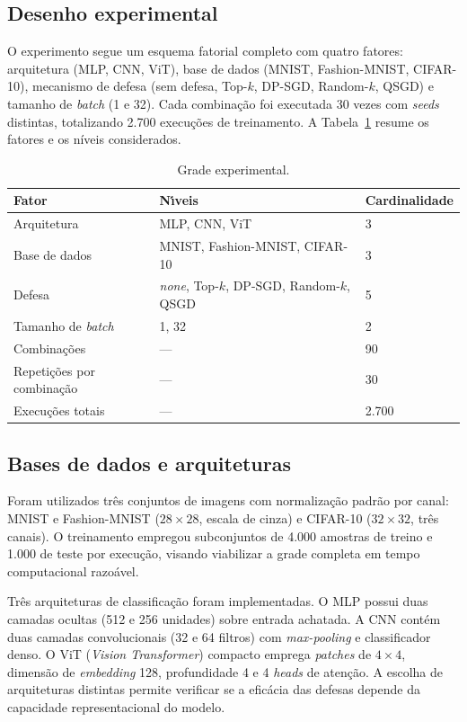 \documentclass[kdmile,a4paper]{kdmile}
\begin{document}
\subsection{Desenho experimental}

O experimento segue um esquema fatorial completo com quatro fatores: arquitetura (MLP, CNN, ViT), base de dados (MNIST, Fashion-MNIST, CIFAR-10), mecanismo de defesa (sem defesa, Top-$k$, DP-SGD, Random-$k$, QSGD) e tamanho de \textit{batch} (1 e 32). Cada combina\c{c}\~{a}o foi executada 30 vezes com \textit{seeds} distintas, totalizando 2.700 execu\c{c}\~{o}es de treinamento. A Tabela~\ref{tab:grade} resume os fatores e os n\'{i}veis considerados.

\begin{table}[t]
\centering
\caption{Grade experimental.}
\label{tab:grade}
\small
\begin{tabular}{lll}
\toprule
\textbf{Fator} & \textbf{N\'{\i}veis} & \textbf{Cardinalidade} \\
\midrule
Arquitetura & MLP, CNN, ViT & 3 \\
Base de dados & MNIST, Fashion-MNIST, CIFAR-10 & 3 \\
Defesa & \textit{none}, Top-$k$, DP-SGD, Random-$k$, QSGD & 5 \\
Tamanho de \textit{batch} & 1, 32 & 2 \\
\midrule
Combina\c{c}\~{o}es & --- & 90 \\
Repeti\c{c}\~{o}es por combina\c{c}\~{a}o & --- & 30 \\
Execu\c{c}\~{o}es totais & --- & 2.700 \\
\bottomrule
\end{tabular}
\end{table}

\subsection{Bases de dados e arquiteturas}

Foram utilizados tr\^{e}s conjuntos de imagens com normaliza\c{c}\~{a}o padr\~{a}o por canal: MNIST e Fashion-MNIST ($28 \times 28$, escala de cinza) e CIFAR-10 ($32 \times 32$, tr\^{e}s canais). O treinamento empregou subconjuntos de 4.000 amostras de treino e 1.000 de teste por execu\c{c}\~{a}o, visando viabilizar a grade completa em tempo computacional razo\'{a}vel.

Tr\^{e}s arquiteturas de classifica\c{c}\~{a}o foram implementadas. O MLP possui duas camadas ocultas (512 e 256 unidades) sobre entrada achatada. A CNN cont\'{e}m duas camadas convolucionais (32 e 64 filtros) com \textit{max-pooling} e classificador denso. O ViT (\textit{Vision Transformer}) compacto emprega \textit{patches} de $4 \times 4$, dimens\~{a}o de \textit{embedding} 128, profundidade 4 e 4 \textit{heads} de aten\c{c}\~{a}o. A escolha de arquiteturas distintas permite verificar se a efic\'{a}cia das defesas depende da capacidade representacional do modelo.
\end{document}
